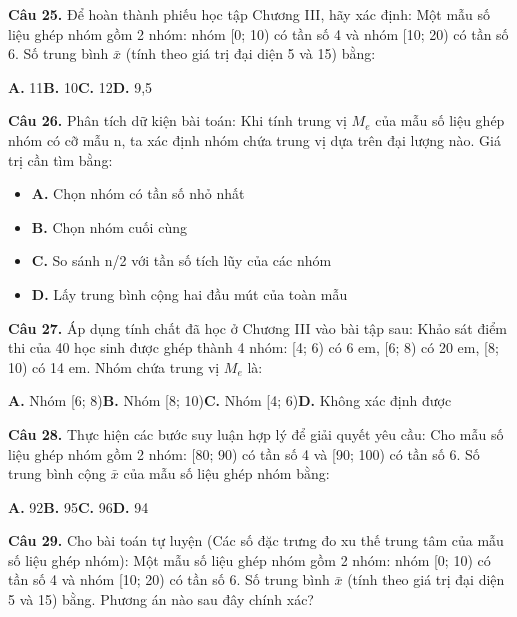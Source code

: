 \documentclass[11pt,a4paper]{article}
\begin{document}
\textbf{\color{primary} Câu 25.} Để hoàn thành phiếu học tập Chương III, hãy xác định: Một mẫu số liệu ghép nhóm gồm 2 nhóm: nhóm [0; 10) có tần số 4 và nhóm [10; 20) có tần số 6. Số trung bình $\bar{x}$ (tính theo giá trị đại diện 5 và 15) bằng:\par
\hspace*{1.5em}\textbf{A.} 11\quad\quad \textbf{B.} 10\quad\quad \textbf{C.} 12\quad\quad \textbf{D.} 9,5\par\vspace{2pt}
\textbf{\color{primary} Câu 26.} Phân tích dữ kiện bài toán: Khi tính trung vị $M_e$ của mẫu số liệu ghép nhóm có cỡ mẫu n, ta xác định nhóm chứa trung vị dựa trên đại lượng nào. Giá trị cần tìm bằng:\par
\begin{itemize}\setlength{\itemsep}{1pt}\setlength{\parskip}{0pt}
  \item[] \textbf{A.} Chọn nhóm có tần số nhỏ nhất
  \item[] \textbf{B.} Chọn nhóm cuối cùng
  \item[] \textbf{C.} So sánh n/2 với tần số tích lũy của các nhóm
  \item[] \textbf{D.} Lấy trung bình cộng hai đầu mút của toàn mẫu
\end{itemize}\vspace{2pt}
\textbf{\color{primary} Câu 27.} Áp dụng tính chất đã học ở Chương III vào bài tập sau: Khảo sát điểm thi của 40 học sinh được ghép thành 4 nhóm: [4; 6) có 6 em, [6; 8) có 20 em, [8; 10) có 14 em. Nhóm chứa trung vị $M_e$ là:\par
\hspace*{1.5em}\textbf{A.} Nhóm [6; 8)\quad\quad \textbf{B.} Nhóm [8; 10)\quad\quad \textbf{C.} Nhóm [4; 6)\quad\quad \textbf{D.} Không xác định được\par\vspace{2pt}
\textbf{\color{primary} Câu 28.} Thực hiện các bước suy luận hợp lý để giải quyết yêu cầu: Cho mẫu số liệu ghép nhóm gồm 2 nhóm: [80; 90) có tần số 4 và [90; 100) có tần số 6. Số trung bình cộng $\bar{x}$ của mẫu số liệu ghép nhóm bằng:\par
\hspace*{1.5em}\textbf{A.} 92\quad\quad \textbf{B.} 95\quad\quad \textbf{C.} 96\quad\quad \textbf{D.} 94\par\vspace{2pt}
\textbf{\color{primary} Câu 29.} Cho bài toán tự luyện (Các số đặc trưng đo xu thế trung tâm của mẫu số liệu ghép nhóm): Một mẫu số liệu ghép nhóm gồm 2 nhóm: nhóm [0; 10) có tần số 4 và nhóm [10; 20) có tần số 6. Số trung bình $\bar{x}$ (tính theo giá trị đại diện 5 và 15) bằng. Phương án nào sau đây chính xác?\par
\end{document}
